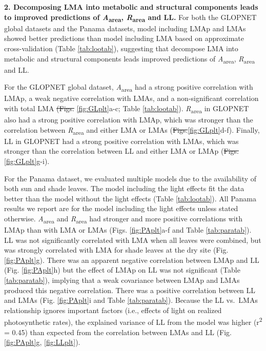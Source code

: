 \documentclass[
  12pt,
]{article}
\providecommand{\DIFaddtex}[1]{{\protect\color{blue}\uwave{#1}}} %
\providecommand{\DIFdeltex}[1]{{\protect\color{red}\sout{#1}}}                      %
\providecommand{\DIFaddbegin}{} %
\providecommand{\DIFaddend}{} %
\providecommand{\DIFdelbegin}{} %
\providecommand{\DIFdelend}{} %
\providecommand{\DIFadd}[1]{\texorpdfstring{\DIFaddtex{#1}}{#1}} %
\providecommand{\DIFdel}[1]{\texorpdfstring{\DIFdeltex{#1}}{}} %
\newcommand{\DIFscaledelfig}{0.5}
\newlength{\DIFdelgraphicswidth} %
\newlength{\DIFdelgraphicsheight} %
\newcommand{\DIFaddincludegraphics}[2][]{{\color{blue}\fbox{\DIFOincludegraphics[#1]{#2}}}} %
\newcommand{\DIFdelincludegraphics}[2][]{%
\sbox{\DIFdelgraphicsbox}{\DIFOincludegraphics[#1]{#2}}%
\settoboxwidth{\DIFdelgraphicswidth}{\DIFdelgraphicsbox} %
\settoboxtotalheight{\DIFdelgraphicsheight}{\DIFdelgraphicsbox} %
\scalebox{\DIFscaledelfig}{%
\parbox[b]{\DIFdelgraphicswidth}{\usebox{\DIFdelgraphicsbox}\\[-\baselineskip] \rule{\DIFdelgraphicswidth}{0em}}\llap{\resizebox{\DIFdelgraphicswidth}{\DIFdelgraphicsheight}{%
\setlength{\unitlength}{\DIFdelgraphicswidth}%
\begin{picture}(1,1)%
\thicklines\linethickness{2pt} %
{\color[rgb]{1,0,0}\put(0,0){\framebox(1,1){}}}%
{\color[rgb]{1,0,0}\put(0,0){\line( 1,1){1}}}%
{\color[rgb]{1,0,0}\put(0,1){\line(1,-1){1}}}%
\end{picture}%
}\hspace*{3pt}}} %
} %
\DeclareRobustCommand{\DIFaddbegin}{\DIFOaddbegin \let\includegraphics\DIFaddincludegraphics} %
\DeclareRobustCommand{\DIFaddend}{\DIFOaddend \let\includegraphics\DIFOincludegraphics} %
\DeclareRobustCommand{\DIFdelbegin}{\DIFOdelbegin \let\includegraphics\DIFdelincludegraphics} %
\DeclareRobustCommand{\DIFdelend}{\DIFOaddend \let\includegraphics\DIFOincludegraphics} %
\begin{document}
\textbf{2. Decomposing LMA into metabolic and structural components leads to improved predictions of \emph{A}\textsubscript{area}, \emph{R}\textsubscript{area} and LL.}
For both the GLOPNET global datasets and the Panama datasets, model including LMAp and LMAs showed better predictions than model including LMA based on approximate cross-validation (Table \ref{tab:lootab}), suggesting that decompose LMA into metabolic and structural components leads improved predictions of \emph{A}\textsubscript{area}, \emph{R}\textsubscript{area} and LL.

For the GLOPNET global dataset, \emph{A}\textsubscript{area} had a strong positive correlation with LMAp, a weak negative correlation with LMAs, and a non-significant correlation with total LMA \DIFdelbegin \DIFdel{(Figs. }\DIFdelend \DIFaddbegin \DIFadd{. Fig.~}\DIFaddend \ref{fig:GLplt}a-c; Table \ref{tab:lootab}).
\emph{R}\textsubscript{area} in GLOPNET also had a strong positive correlation with LMAp, which was stronger than the correlation between \emph{R}\textsubscript{area} and either LMA or LMAs (\DIFdelbegin \DIFdel{Figs.}\DIFdelend \DIFaddbegin \DIFadd{Fig.~}\DIFaddend \ref{fig:GLplt}d-f).
Finally, LL in GLOPNET had a strong positive correlation with LMAs, which was stronger than the correlation between LL and either LMA or LMAp (\DIFdelbegin \DIFdel{Figs.}\DIFdelend \DIFaddbegin \DIFadd{Fig.~}\DIFaddend \ref{fig:GLplt}g-i).

For the Panama dataset, we evaluated multiple models due to the availability of both sun and shade leaves.
The model including the light effects fit the data better than the model without the light effects (Table \ref{tab:lootab}).
All Panama results we report are for the model including the light effects unless stated otherwise.
\emph{A}\textsubscript{area} and \emph{R}\textsubscript{area} had stronger and more positive correlations with LMAp than with LMA or LMAs (Figs. \ref{fig:PAplt}a-f and Table \ref{tab:paratab}).
LL was not significantly correlated with LMA when all leaves were combined, but was strongly correlated with LMA for shade leaves at the dry site (Fig. \ref{fig:PAplt}g).
There was an apparent negative correlation between LMAp and LL (Fig. \ref{fig:PAplt}h) but the effect of LMAp on LL was not significant (Table \ref{tab:paratab}), implying that a weak covariance between LMAp and LMAs produced this negative correlation.
There was a positive correlation between LL and LMAs (Fig. \ref{fig:PAplt}i and Table \ref{tab:paratab}).
Because the LL vs.~LMAs relationship ignores important factors (i.e., effects of light on realized photosynthetic rates), the explained variance of LL from the model was higher (r\textsuperscript{2} = 0.45) than expected from the correlation between LMAs and LL (Fig. \ref{fig:PAplt}g, \DIFaddbegin \DIFadd{Fig.~}\DIFaddend \ref{fig:LLplt}).
\end{document}

